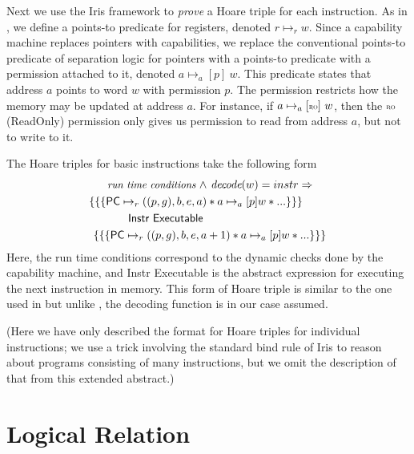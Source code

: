 \documentclass[sigplan,review]{acmart}\settopmatter{printfolios=true,printccs=false,printacmref=false}
\newcommand{\sep}{-\kern-.6em\raisebox{-.659ex}{*}\ }
\newcommand{\interp}[2]{(#1)(#2)}
\begin{document}
Next we use the Iris framework to \emph{prove} a Hoare triple for each instruction.
As in \cite{Jensen:2013}, we define a points-to predicate for registers, denoted $r \mapsto_r w$.
Since a capability machine replaces pointers with capabilities, we replace the conventional points-to predicate of separation logic for pointers with a points-to predicate with a permission attached to it, denoted
$a \mapsto_a[p]~w$. 
This predicate states that address $a$ points to word $w$ with permission $p$.
The permission restricts how the memory may be updated at address $a$.
For instance, if $a \mapsto_a[\textsc{\tiny RO}]~w$, then the $\textsc{\tiny RO}$ (ReadOnly)
permission only gives us permission to read from address $a$, but not to write to it.

The Hoare triples for basic instructions take the following form
\begin{align*}
\small
	\textit{run time conditions } \wedge &\textit{ decode}(w) = instr \Rightarrow  \\
	\{\{\{ \textsf{PC} \mapsto_r ((p,g),b,e,a) &* a \mapsto_a[p] w * ... \}\}\} \\ 
	\textsf{Instr Executable }\\
	\{\{\{\textsf{PC} \mapsto_r ((p,g),b,e,a&+1) * a \mapsto_a[p] w * ... \}\}\}
\end{align*} 
Here, the run time conditions correspond to the dynamic checks done by the capability machine, and \textsf{Instr Executable} is the abstract expression for executing the next instruction in memory.
This form of Hoare triple is similar to the one used in \cite{Jensen:2013} but
unlike \cite{Jensen:2013}, the decoding function is in our case assumed.

(Here we have only described the format for Hoare triples for individual instructions; we use a trick involving the standard bind rule of Iris to reason about programs consisting of many instructions, but we omit the description of that from this extended abstract.)

\section{Logical Relation}


\end{document}
